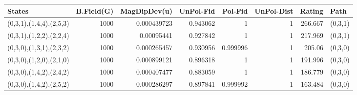 \begin{tabular}{lrrrrrrl}
\hline
 States                  &   B.Field(G) &   MagDipDev(u) &   UnPol-Fid &   Pol-Fid &   UnPol-Dist &   Rating & Path    \\
\hline
 (0,3,1),(1,4,4),(2,5,3) &         1000 &    0.000439723 &    0.943062 &  1        &            1 &  266.667 & (0,3,1) \\
 (0,3,1),(1,2,2),(2,2,4) &         1000 &    0.00095441  &    0.927842 &  1        &            1 &  217.969 & (0,3,1) \\
 (0,3,0),(1,3,1),(2,3,2) &         1000 &    0.000265457 &    0.930956 &  0.999996 &            1 &  205.06  & (0,3,0) \\
 (0,3,0),(1,2,0),(2,1,0) &         1000 &    0.000899121 &    0.896318 &  1        &            1 &  191.996 & (0,3,0) \\
 (0,3,0),(1,4,2),(2,4,2) &         1000 &    0.000407477 &    0.883059 &  1        &            1 &  186.779 & (0,3,0) \\
 (0,3,0),(1,4,2),(2,5,2) &         1000 &    0.000286297 &    0.897841 &  0.999992 &            1 &  163.484 & (0,3,0) \\
\hline
\end{tabular}